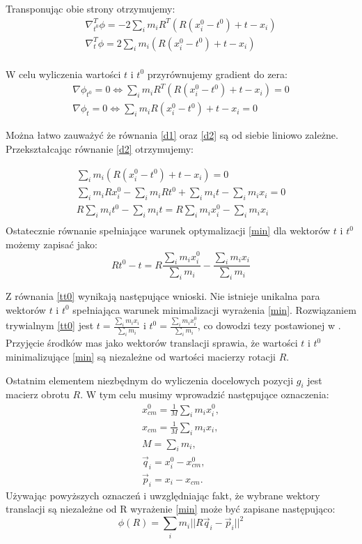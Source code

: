 Transponując obie strony otrzymujemy:
\begin{eqnarray*}
\nabla_{t^0}^T \phi = -2 \sum_i m_i R^T (R (x^0_i - t^0) + t - x_i)\\
\nabla_{t}^T \phi = 2 \sum_i m_i (R (x^0_i - t^0) + t - x_i)\\
\end{eqnarray*}

W celu wyliczenia wartości $t$ i $t^0$ przyrównujemy gradient do zera:
\begin{eqnarray}
\label{d1}
\nabla \phi_{t^0} = 0 \Leftrightarrow \sum_i m_i R^T (R (x^0_i - t^0) + t - x_i) = 0\\
\label{d2}
\nabla \phi_{t} = 0 \Leftrightarrow \sum_i m_i R (x^0_i - t^0) + t - x_i = 0
\end{eqnarray}

Można łatwo zauważyć że równania \ref{d1} oraz \ref{d2} są od siebie liniowo
zależne. Przekształcając równanie \ref{d2} otrzymujemy:

\begin{eqnarray*}
\sum_i m_i (R (x^0_i - t^0) + t - x_i) = 0\\
\sum_i m_i R x^0_i - \sum_i m_i R t^0 + \sum_i m_i t - \sum_i m_i x_i = 0\\
R \sum_i m_i t^0 - \sum_i m_i t = R \sum_i m_i x^0_i - \sum_i m_i x_i\\
\end{eqnarray*}
Ostatecznie równanie spełniające warunek optymalizacji \ref{min} dla wektorów $t$
i $t^0$ możemy zapisać jako:
\begin{equation}
\label{tt0}
R t^0 - t = R \frac{\sum_i m_i x^0_i}{\sum_i m_i} - \frac{\sum_i m_i
	x_i}{\sum_i m_i}
\end{equation}

Z równania \ref{tt0} wynikają następujące wnioski. Nie istnieje unikalna para
wektorów
$t$ i $t^0$ spełniająca warunek minimalizacji wyrażenia \ref{min}. Rozwiązaniem
trywialnym \ref{tt0} jest $t = \frac{\sum_i m_i x_i}{\sum_i m_i}$
i $t^0 = \frac{\sum_i m_i x^0_i}{\sum_i m_i}$,
	co dowodzi tezy postawionej w \cite{shape}. Przyjęcie środków mas jako
	wektorów translacji sprawia, że wartości $t$ i $t^0$ minimalizujące
	\ref{min} są niezależne od wartości macierzy rotacji $R$.

Ostatnim elementem niezbędnym do wyliczenia docelowych pozycji $g_i$ jest
macierz obrotu $R$. W tym celu musimy wprowadzić następujące oznaczenia:
\begin{eqnarray*}
x_{cm}^0 = \frac{1}{M} \sum_i m_i x_i^0,\\
x_{cm} = \frac{1}{M} \sum_i m_i x_i,\\
M = \sum_i m_i,\\
\vec{q}_i = x_i^0 - x_{cm}^0,\\
\vec{p}_i = x_i - x_{cm}.
\end{eqnarray*}
Używając powyższych oznaczeń i uwzględniając fakt, że wybrane wektory translacji
są niezależne od R wyrażenie \ref{min} może być zapisane następująco:
\begin{equation*}
\phi(R) = \sum_i m_i || R\vec{q}_i - \vec{p}_i||^2
\end{equation*}

